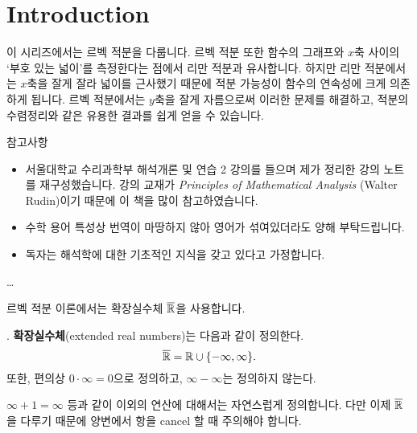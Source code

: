\section*{Introduction}

이 시리즈에서는 르벡 적분을 다룹니다. 르벡 적분 또한 함수의 그래프와 \(x\)축 사이의 `부호 있는 넓이'를 측정한다는 점에서 리만 적분과 유사합니다. 하지만 리만 적분에서는 \(x\)축을 잘게 잘라 넓이를 근사했기 때문에 적분 가능성이 함수의 연속성에 크게 의존하게 됩니다. 르벡 적분에서는 \(y\)축을 잘게 자름으로써 이러한 문제를 해결하고, 적분의 수렴정리와 같은 유용한 결과를 쉽게 얻을 수 있습니다.

참고사항
\begin{itemize}
    \item 서울대학교 수리과학부 해석개론 및 연습 2 강의를 들으며 제가 정리한 강의 노트를 재구성했습니다. 강의 교재가 \textit{Principles of Mathematical Analysis} (Walter Rudin)이기 때문에 이 책을 많이 참고하였습니다.
    \item 수학 용어 특성상 번역이 마땅하지 않아 영어가 섞여있더라도 양해 부탁드립니다.
    \item 독자는 해석학에 대한 기초적인 지식을 갖고 있다고 가정합니다.
\end{itemize}

\dots

르벡 적분 이론에서는 확장실수체 \(\overline{\R}\)을 사용합니다.

. \note{\(\overline{\R}\)} \textbf{확장실수체}(extended real numbers)는 다음과 같이 정의한다.
\[
    \overline{\mathbb{R}} = \mathbb{R} \cup \{-\infty, \infty\}.
\]
또한, 편의상 \(0\cdot \infty = 0\)으로 정의하고, \(\infty - \infty\)는 정의하지 않는다.

\(\infty + 1 = \infty\) 등과 같이 이외의 연산에 대해서는 자연스럽게 정의합니다. 다만 이제 \(\overline{\R}\)을 다루기 때문에 양변에서 항을 cancel 할 때 주의해야 합니다.

\pagebreak
